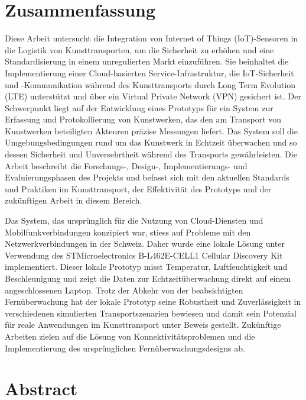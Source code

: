 \chapter*{Zusammenfassung}

Diese Arbeit untersucht die Integration von Internet of Things (IoT)-Sensoren in die Logistik von Kunsttransporten, um die Sicherheit zu erhöhen und eine Standardisierung in einem unregulierten Markt einzuführen. Sie beinhaltet die Implementierung einer Cloud-basierten Service-Infrastruktur, die IoT-Sicherheit und -Kommunikation während des Kunsttransports durch Long Term Evolution (LTE) unterstützt und über ein Virtual Private Network (VPN) gesichert ist. Der Schwerpunkt liegt auf der Entwicklung eines Prototyps für ein System zur Erfassung und Protokollierung von Kunstwerken, das den am Transport von Kunstwerken beteiligten Akteuren präzise Messungen liefert. Das System soll die Umgebungsbedingungen rund um das Kunstwerk in Echtzeit überwachen und so dessen Sicherheit und Unversehrtheit während des Transports gewährleisten. Die Arbeit beschreibt die Forschungs-, Design-, Implementierungs- und Evaluierungsphasen des Projekts und befasst sich mit den aktuellen Standards und Praktiken im Kunsttransport, der Effektivität des Prototyps und der zukünftigen Arbeit in diesem Bereich.

Das System, das ursprünglich für die Nutzung von Cloud-Diensten und Mobilfunkverbindungen konzipiert war, stiess auf Probleme mit den Netzwerkverbindungen in der Schweiz. Daher wurde eine lokale Lösung unter Verwendung des STMicroelectronics B-L462E-CELL1 Cellular Discovery Kit implementiert. Dieser lokale Prototyp misst Temperatur, Luftfeuchtigkeit und Beschleunigung und zeigt die Daten zur Echtzeitüberwachung direkt auf einem angeschlossenen Laptop. Trotz der Abkehr von der beabsichtigten Fernüberwachung hat der lokale Prototyp seine Robustheit und Zuverlässigkeit in verschiedenen simulierten Transportszenarien bewiesen und damit sein Potenzial für reale Anwendungen im Kunsttransport unter Beweis gestellt. Zukünftige Arbeiten zielen auf die Lösung von Konnektivitätsproblemen und die Implementierung des ursprünglichen Fernüberwachungsdesigns ab.


\chapter*{Abstract}

